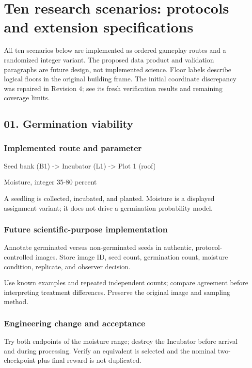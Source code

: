 \chapter{Ten research scenarios: protocols and extension specifications}
All ten scenarios below are implemented as ordered gameplay routes and a randomized integer variant.\allowbreak{} The proposed data product and validation paragraphs are future design, not implemented science.\allowbreak{} Floor labels describe logical floors in the original building frame.\allowbreak{} The initial coordinate discrepancy was repaired in Revision 4; see its fresh verification results and remaining coverage limits.\allowbreak{}

\section{01.\allowbreak{} Germination viability}
\subsection{Implemented route and parameter}
Seed bank (B1) -> Incubator (L1) -> Plot 1 (roof)

Moisture, integer 35-80 percent

A seedling is collected, incubated, and planted.\allowbreak{} Moisture is a displayed assignment variant; it does not drive a germination probability model.\allowbreak{}

\subsection{Future scientific-purpose implementation}
Annotate germinated versus non-germinated seeds in authentic, protocol-controlled images.\allowbreak{} Store image ID, seed count, germination count, moisture condition, replicate, and observer decision.\allowbreak{}

Use known examples and repeated independent counts; compare agreement before interpreting treatment differences.\allowbreak{} Preserve the original image and sampling method.\allowbreak{}

\subsection{Engineering change and acceptance}
Try both endpoints of the moisture range; destroy the Incubator before arrival and during processing.\allowbreak{} Verify an equivalent is selected and the nominal two-checkpoint plus final reward is not duplicated.\allowbreak{}

